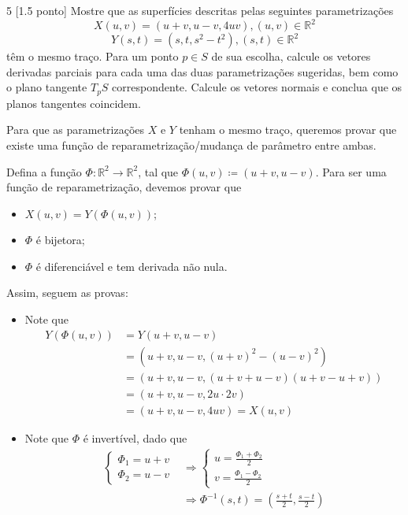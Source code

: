 \documentclass[../main.tex]{subfiles}
\begin{document}
		\begin{exercicio}{5}
			[1.5 ponto] Mostre que as superfícies descritas pelas seguintes parametrizações
			\[
			X(u,v)=(u+v, u-v, 4uv), (u,v) \in \mathbb{R}^2
			\]
			\[
			Y(s,t)=(s,t,s^2-t^2), (s,t) \in \mathbb{R}^2
			\]
			têm o mesmo traço. Para um ponto $p\in S$ de sua escolha, calcule os vetores derivadas parciais para cada uma das duas parametrizações sugeridas, bem como o plano tangente $T_pS$ correspondente. Calcule os vetores normais e conclua que os planos tangentes coincidem.
		\end{exercicio}
		\begin{solucao}
			Para que as parametrizações $X$ e $Y$ tenham o mesmo traço, queremos provar que existe uma função de reparametrização/mudança de parâmetro entre ambas.
			
			Defina a função $\Phi\colon \mathbb{R}^2\to \mathbb{R}^2$, tal que $\Phi(u,v)\coloneq (u+v,u-v)$. Para ser uma função de reparametrização, devemos provar que
			\begin{itemize}
				\item $X(u,v)=Y(\Phi(u,v))$;
				\item $\Phi$ é bijetora;
				\item $\Phi$ é diferenciável e tem derivada não nula.
			\end{itemize}
			Assim, seguem as provas:
			\begin{itemize}
				\item Note que
				\begin{align*}
					Y(\Phi(u,v))
					&=Y(u+v,u-v)\\
					&=(u+v, u-v, (u+v)^2-(u-v)^2)\\
					&=(u+v,u-v,(u+v+u-v)(u+v-u+v))\\
					&=(u+v, u-v, 2u\cdot 2v)\\
					&=(u+v,u-v, 4uv)=X(u,v)
				\end{align*}
				\item Note que $\Phi$ é invertível, dado que
				\begin{align*}
					\begin{cases}\Phi_1=u+v\\\Phi_2=u-v\end{cases}
					&\Rightarrow \begin{cases}u=\tfrac{\Phi_1+\Phi_2}{2}\\v=\tfrac{\Phi_1-\Phi_2}{2}\end{cases}\\
					&\Rightarrow\Phi^{-1}(s,t)=(\tfrac{s+t}{2}, \tfrac{s-t}{2})

\end{align*}
\end{itemize}
\end{solucao}
\end{document}
